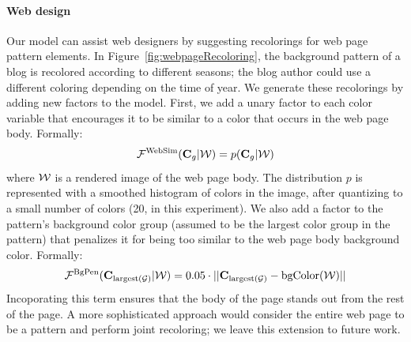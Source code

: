 \paragraph{Web design}
Our model can assist web designers by suggesting recolorings for web page pattern elements. In Figure~\ref{fig:webpageRecoloring}, the background pattern of a blog is recolored according to different seasons; the blog author could use a different coloring depending on the time of year. We generate these recolorings by adding new factors to the model. First, we add a unary factor to each color variable that encourages it to be similar to a color that occurs in the web page body. Formally:
\begin{equation*}
\mathcal{F}^\textrm{WebSim}(\mathbf{C}_g | \mathcal{W}) = p(\mathbf{C}_g | \mathcal{W})
\end{equation*}
where $\mathcal{W}$ is a rendered image of the web page body. The distribution $p$ is represented with a smoothed histogram of colors in the image, after quantizing to a small number of colors (20, in this experiment).
We also add a factor to the pattern's background color group (assumed to be the largest color group in the pattern) that penalizes it for being too similar to the web page body background color. Formally:
\begin{equation*}
\mathcal{F}^\textrm{BgPen}(\mathbf{C}_{\textrm{largest}(\mathcal{G})} | \mathcal{W}) = 0.05 \cdot || \mathbf{C}_{\textrm{largest}(\mathcal{G})} - \textrm{bgColor}(\mathcal{W}) ||
\end{equation*}
Incoporating this term ensures that the body of the page stands out from the rest of the page. A more sophisticated approach would consider the entire web page to be a pattern and perform joint recoloring; we leave this extension to future work.


